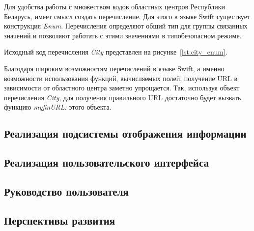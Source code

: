 Для удобства работы с множеством кодов областных центров Республики Беларусь,
имеет смысл создать перечисление. Для этого в языке Swift существует
конструкция \textit{Enum}.
Перечисления определяют общий тип для группы связанных значений и позволяют
работать с этими значениями в типобезопасном режиме.

Исходный код перечисления \textit{City} представлен на рисунке~\ref{lst:city_enum}.


Благодаря широким возможностям перечислений в языке Swift, а именно
возможности использования функций, вычисляемых полей, получение URL в
зависимости от областного центра заметно упрощается. Так, используя объект
перечисления \textit{City}, для получения правильного URL достаточно
будет вызвать функцию \textit{myfinURL:} этого объекта.









\pagebreak



\subsection{Реализация подсистемы отображения информации}



\subsection{Реализация пользовательского интерфейса}



\subsection{Руководство пользователя}



\subsection{Перспективы развития}
\pagebreak
